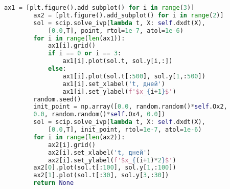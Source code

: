\begin{lstlisting}[language=Python, showstringspaces=false, caption=Файл \texttt{model.py}.]
		ax1 = [plt.figure().add_subplot() for i in range(3)]
		ax2 = [plt.figure().add_subplot() for i in range(2)]
		sol = scip.solve_ivp(lambda t, X: self.dxdt(X), 
			[0.0,T], point, rtol=1e-7, atol=1e-6)
		for i in range(len(ax1)):
			ax1[i].grid()
			if i == 0 or i == 3:
				ax1[i].plot(sol.t, sol.y[i,:])
			else:
				ax1[i].plot(sol.t[:500], sol.y[1,:500])
				ax1[i].set_xlabel('t, дней')
				ax1[i].set_ylabel(f'$x_{i+1}$')
		random.seed()
		init_point = np.array([0.0, random.random()*self.Ox2,
		0.0, random.random()*self.Ox4, 0.0])
		sol = scip.solve_ivp(lambda t, X: self.dxdt(X), 
			[0.0,T], init_point, rtol=1e-7, atol=1e-6)
		for i in range(len(ax2)):
			ax2[i].grid()
			ax2[i].set_xlabel('t, дней')
			ax2[i].set_ylabel(f'$x_{(i+1)*2}$')
		ax2[0].plot(sol.t[:100], sol.y[1,:100])
		ax2[1].plot(sol.t[:30], sol.y[3,:30])
		return None
\end{lstlisting}
\newpage

